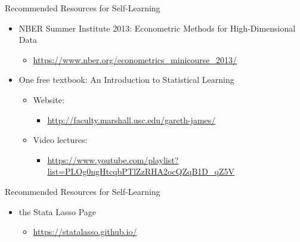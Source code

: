 \documentclass[dvipsnames,hyperref={pdfpagelabels=false}]{beamer}
\begin{document}
	
\begin{frame}{Recommended Resources for Self-Learning}
	\begin{itemize}
		\item NBER Summer Institute 2013: Econometric Methods for High-Dimensional
		Data
		\vspace{0.2cm}
		\begin{itemize}
			\item \url{https://www.nber.org/econometrics_minicourse_2013/}
	\vspace{0.2cm}
		\end{itemize}
		\item One free textbook: An Introduction to Statistical Learning
		\vspace{0.2cm}
		\begin{itemize}
			\item Website: 
							\vspace{0.2cm} 
					\begin{itemize}
			\item \url{http://faculty.marshall.usc.edu/gareth-james/}
				\vspace{0.2cm}
						\end{itemize}
			\item Video lectures:  
							\vspace{0.2cm} 
								\begin{itemize}
			\item \url{https://www.youtube.com/playlist?list=PLOg0ngHtcqbPTlZzRHA2ocQZqB1D_qZ5V}
									\end{itemize}
		\end{itemize}

	

	
	\end{itemize}
\end{frame}


\begin{frame}{Recommended Resources for Self-Learning}
\begin{itemize}
	\item the Stata Lasso Page
	\vspace{0.2cm}
	\begin{itemize}
		\item \url{https://statalasso.github.io/}
		\vspace{0.2cm}
	\end{itemize}
	
	
	
\end{itemize}
\end{frame}
\end{document}
